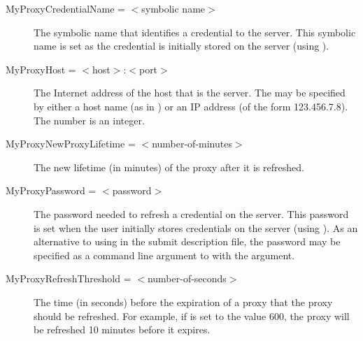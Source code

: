 \begin{description}

\label{condor-submit-MyProxyCredentialName}
\item[MyProxyCredentialName = $<$symbolic name$>$]
The symbolic name that identifies a credential to the  server.
This symbolic name is set as the credential is
initially stored on the server (using ).



\label{condor-submit-MyProxyHost}
\item[MyProxyHost = $<$host$>$:$<$port$>$]
The Internet address of the host that is the  server.
The  may be specified by either a host name
(as in ) or an IP address
(of the form 123.456.7.8).
The  number is an integer.


\label{condor-submit-MyProxyLifetime}
\item[MyProxyNewProxyLifetime = $<$number-of-minutes$>$]
The new lifetime (in minutes) of the proxy after it is refreshed.


\label{condor-submit-MyProxyPassword}
\item[MyProxyPassword = $<$password$>$]
The password needed to refresh a credential on the  server.
This password is set when the user initially stores
credentials on the server (using ).
As an alternative to using  in the
submit description file,
the password may be specified as a command line argument to 
with the  argument.


\label{condor-submit-MyProxyThreshhold}
\item[MyProxyRefreshThreshold = $<$number-of-seconds$>$]
The time (in seconds) before the expiration of a proxy 
that the proxy should be refreshed.
For example, if  is set to the
value 600, the proxy will be refreshed 10 minutes before
it expires.


\end{description}

